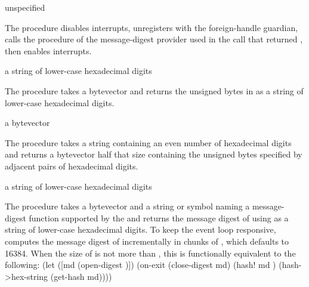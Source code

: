 \begin{procedure}
\end{procedure}
\returns{} unspecified

The  procedure disables interrupts, unregisters 
with the foreign-handle guardian, calls the  procedure of the
message-digest provider used in the  call that returned
, then enables interrupts.

\begin{procedure}
\end{procedure}
\returns{} a string of lower-case hexadecimal digits

The  procedure takes a bytevector  and returns
the unsigned bytes in  as a string of lower-case hexadecimal digits.

\begin{procedure}
\end{procedure}
\returns{} a bytevector

The  procedure takes a string 
containing an even number of hexadecimal digits and returns a
bytevector half that size containing the unsigned bytes
specified by adjacent pairs of hexadecimal digits.

\begin{procedure}
\end{procedure}
\returns{} a string of lower-case hexadecimal digits

The  procedure takes a bytevector  and a
string or symbol  naming a message-digest function supported by the
 and returns the message digest of 
using  as a string of lower-case hexadecimal digits.
To keep the event loop responsive,  computes
the message digest of  incrementally in chunks of ,
which defaults to 16384.
When the size of  is not more than , this is
functionally equivalent to the following:
\codebegin
(let ([md (open-digest )])
  (on-exit (close-digest md)
    (hash! md )
    (hash->hex-string (get-hash md))))
\codeend

